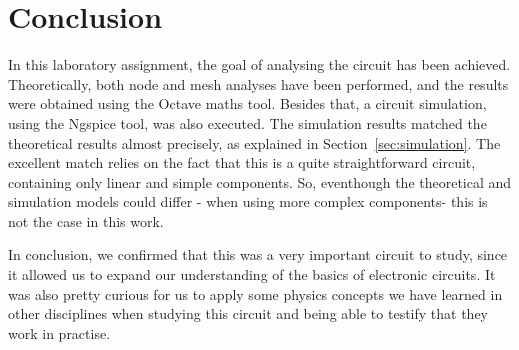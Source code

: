 \section{Conclusion}
\label{sec:conclusion}
\vspace{3mm}
\par In this laboratory assignment, the goal of analysing the circuit has been achieved. Theoretically, both node and mesh analyses have been performed, and the results were obtained using the Octave maths tool. Besides that, a circuit simulation, using the Ngspice tool, was also executed. The simulation results matched the theoretical results almost precisely, as explained in Section~\ref{sec:simulation}. The excellent match relies on the fact that this is a quite straightforward circuit, containing only linear and simple components. So, eventhough the theoretical and simulation models could differ - when using more complex components- this is not the case in this work.
\vspace{3mm}
\par In conclusion, we confirmed that this was a very important circuit to study, since it allowed us to expand our understanding of the basics of electronic circuits. It was also pretty curious for us to apply some physics concepts we have learned in other disciplines when studying this circuit and being able to testify that they work in practise.
